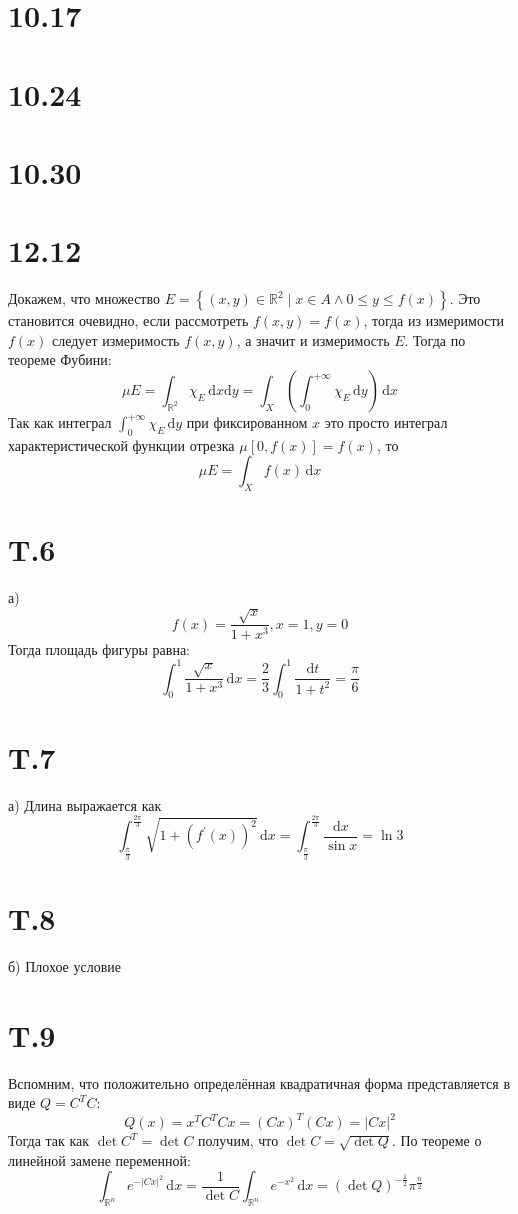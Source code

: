 \documentclass[12pt]{article}
\begin{document}
\section{10.17}
\section{10.24}
\section{10.30}

\section{12.12}
Докажем, что множество $E = \left\{ (x, y) \in \mathbb{R}^2 \mid x \in A \land 0 \leq y \leq f(x) \right\}$. 
Это становится очевидно, если рассмотреть $f(x, y) = f(x)$, тогда из измеримости $f(x)$ следует измеримость 
$f(x, y)$, а значит и измеримость $E$. Тогда по теореме Фубини: 
\[
    \mu E = \int_{\mathbb{R}^2} \chi_E \,\mathrm{d}x \mathrm{d}y = 
    \int_X \left( \int_{0}^{+\infty} \chi_E \,\mathrm{d}y \right) \,\mathrm{d}x 
\]     
Так как интеграл $\int_{0}^{+\infty} \chi_E \,\mathrm{d}y$ при фиксированном $x$ это просто 
интеграл характеристической функции отрезка $\mu [0, f(x)] = f(x)$, то 
\[
    \mu E = \int_X f(x) \,\mathrm{d}x 
\]   
\section{T.6}
а) 
\[
    f(x) = \frac{\sqrt{x} }{1 + x^3}, x = 1, y = 0
\]
Тогда площадь фигуры равна: 
\[
    \int_{0}^{1} \frac{\sqrt{x}}{1 + x^3} \,\mathrm{d}x = 
    \frac{2}{3} \int_{0}^{1} \frac{\mathrm{d}t}{1 + t^2} = 
    \frac{\pi}{6}  
\]
\section{T.7}
а) Длина выражается как 
\[
    \int_{\frac{\pi}{3}}^{\frac{2\pi}{3}} \sqrt{1 + (f^{\prime}(x))^2} \,\mathrm{d}x = 
    \int_{\frac{\pi}{3}}^{\frac{2\pi}{3}} \frac{\mathrm{d}x}{\sin x} = \ln 3
\]
\section{T.8}
б) 
Плохое условие
\section{T.9}
Вспомним, что положительно определённая квадратичная форма представляется в виде $Q = C^T C$: 
\[
    Q(x) = x^T C^T C x = (Cx)^T (Cx) = \left\vert Cx \right\vert^2  
\] 
Тогда так как $\det C^T = \det C$ получим, что $\det C = \sqrt{\det Q}$. 
По теореме о линейной замене переменной: 
\[
    \int_{\mathbb{R}^n} e^{-\left\vert Cx \right\vert^2 } \,\mathrm{d}x = 
    \frac{1}{\det C} \int_{\mathbb{R}^n} e^{-x^2} \,\mathrm{d}x = 
    \left( \det Q \right)^{-\frac{1}{2}} \pi^{\frac{n}{2}}  
\]
\end{document}
